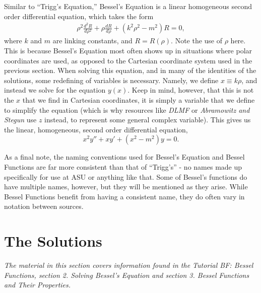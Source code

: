 \documentclass[11pt]{report}
\newcommand{\fpar}[1]{\left({#1}\right)}
\begin{document}
Similar to ``Trigg's Equation,'' Bessel’s Equation is a linear homogeneous second order differential equation, which takes the form
    \begin{align}
        \rho^2\frac{d^2 R}{d\rho^2}+\rho\frac{dR}{d\rho}+\fpar{k^2\rho^2-m^2}R=0,
    \end{align}
where $k$ and $m$ are linking constants, and $R=R(\rho)$. Note the use of $\rho$ here. This is because Bessel's Equation most often shows up in situations where polar coordinates are used, as opposed to the Cartesian coordinate system used in the previous section. When solving this equation, and in many of the identities of the solutions, some redefining of variables is necessary. Namely, we define $x\equiv k\rho$, and instead we solve for the equation $y(x)$. Keep in mind, however, that this is not the $x$ that we find in Cartesian coordinates, it is simply a variable that we define to simplify the equation (which is why resources like \emph{DLMF} or \emph{Abramowitz and Stegun} use $z$ instead, to represent some general complex variable). This gives us the linear, homogeneous, second order differential equation,
    \begin{equation}
        x^2y''+xy'+(x^2-m^2)y = 0.
    \end{equation}
    

As a final note, the naming conventions used for Bessel's Equation and Bessel Functions are far more consistent than that of ``Trigg's'' - no names made up specifically for use at ASU or anything like that. Some of Bessel's functions do have multiple names, however, but they will be mentioned as they arise. While Bessel Functions benefit from having a consistent name, they do often vary in notation between sources.

\section{The Solutions}

\emph{The material in this section covers information found in the Tutorial BF: Bessel Functions, section 2. Solving Bessel’s Equation and section 3. Bessel Functions and Their Properties.}\\
\end{document}
